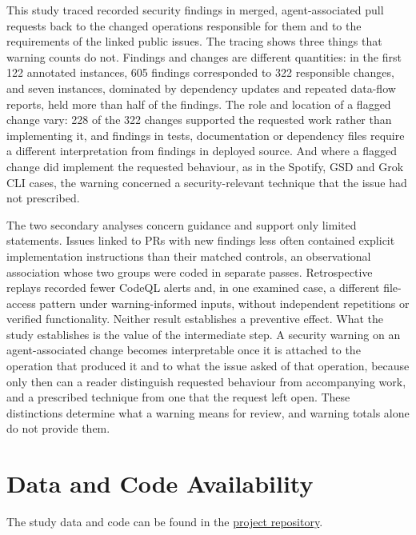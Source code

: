 \documentclass[acmsmall,screen,nonacm]{acmart}
\begin{document}
This study traced recorded security findings in merged, agent-associated pull requests back to the changed operations responsible for them and to the requirements of the linked public issues. The tracing shows three things that warning counts do not. Findings and changes are different quantities: in the first 122 annotated instances, 605 findings corresponded to 322 responsible changes, and seven instances, dominated by dependency updates and repeated data-flow reports, held more than half of the findings. The role and location of a flagged change vary: 228 of the 322 changes supported the requested work rather than implementing it, and findings in tests, documentation or dependency files require a different interpretation from findings in deployed source. And where a flagged change did implement the requested behaviour, as in the Spotify, GSD and Grok CLI cases, the warning concerned a security-relevant technique that the issue had not prescribed.

The two secondary analyses concern guidance and support only limited statements. Issues linked to PRs with new findings less often contained explicit implementation instructions than their matched controls, an observational association whose two groups were coded in separate passes. Retrospective replays recorded fewer CodeQL alerts and, in one examined case, a different file-access pattern under warning-informed inputs, without independent repetitions or verified functionality. Neither result establishes a preventive effect. What the study establishes is the value of the intermediate step. A security warning on an agent-associated change becomes interpretable once it is attached to the operation that produced it and to what the issue asked of that operation, because only then can a reader distinguish requested behaviour from accompanying work, and a prescribed technique from one that the request left open. These distinctions determine what a warning means for review, and warning totals alone do not provide them.

\section*{Data and Code Availability}

The study data and code can be found in the \href{https://github.com/Stralb/adversarial-swe-agents}{project repository}.
\end{document}
